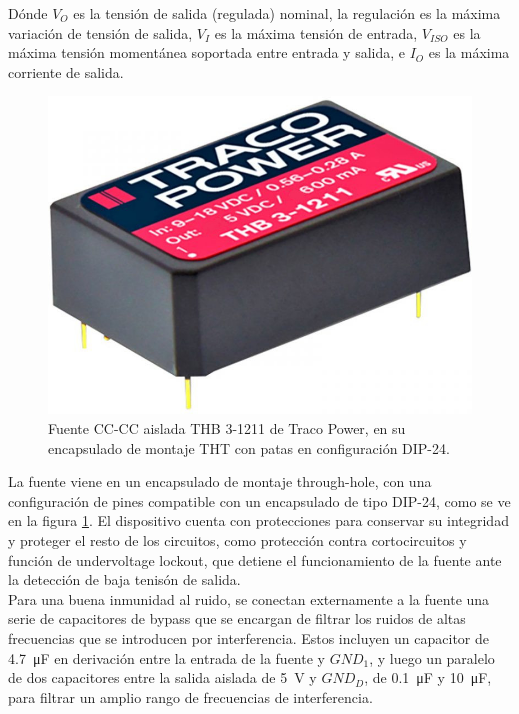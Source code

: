 Dónde $V_O$ es la tensión de salida (regulada) nominal, la regulación es la máxima variación de tensión de salida, $V_I$ es la máxima tensión de entrada, $V_{ISO}$ es la máxima tensión momentánea soportada entre entrada y salida, e $I_O$ es la máxima corriente de salida.\\

\begin{figure}[h]
    \centering
    \includegraphics[scale=0.7]{Imagenes/THB3.jpg}
    \caption{Fuente CC-CC aislada THB 3-1211 de Traco Power, en su encapsulado de montaje THT con patas en configuración DIP-24.}
    \label{encapsulado_TRACO}
\end{figure}

La fuente viene en un encapsulado de montaje through-hole, con una configuración de pines compatible con un encapsulado de tipo DIP-24, como se ve en la figura \ref{encapsulado_TRACO}. El dispositivo cuenta con protecciones para conservar su integridad y proteger el resto de los circuitos, como protección contra cortocircuitos y función de undervoltage lockout, que detiene el funcionamiento de la fuente ante la detección de baja tenisón de salida.\\

Para una buena inmunidad al ruido, se conectan externamente a la fuente una serie de capacitores de bypass que se encargan de filtrar los ruidos de altas frecuencias que se introducen por interferencia. Estos incluyen un capacitor de \SI[]{4.7}[]{\micro\farad} en derivación entre la entrada de la fuente y $GND_1$, y luego un paralelo de dos capacitores entre la salida aislada de \SI[]{5}[]{\volt} y $GND_D$, de \SI[]{0.1}[]{\micro\farad} y \SI[]{10}[]{\micro\farad}, para filtrar un amplio rango de frecuencias de interferencia.\\

